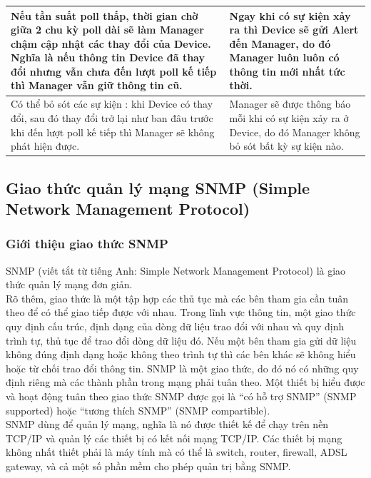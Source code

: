 \documentclass[12pt,oneside,a4paper]{article}
\begin{document}
\begin{longtable}{|p{8cm}|p{8cm}|}
Nếu tần suất poll thấp, thời gian chờ giữa 2 chu kỳ poll dài sẽ làm Manager chậm cập nhật các thay đổi của Device. Nghĩa là nếu thông tin Device đã thay đổi nhưng vẫn chưa đến lượt poll kế tiếp thì Manager vẫn giữ thông tin cũ.                            & Ngay khi có sự kiện xảy ra thì Device sẽ gửi Alert đến Manager, do đó Manager luôn luôn có thông tin mới nhất tức thời.                                                                                                                       \\ \hline
Có thể bỏ sót các sự kiện : khi Device có thay đổi, sau đó thay đổi trở lại như ban đâu trước khi đến lượt poll kế tiếp thì Manager sẽ không phát hiện được.                                                                                                   & Manager sẽ được thông báo mỗi khi có sự kiện xảy ra ở Device, do đó Manager không bỏ sót bất kỳ sự kiện nào.                                                                                                                                  \\ \hline
\end{longtable}
\subsection{Giao thức quản lý mạng SNMP (Simple Network Management Protocol)}
\subsubsection{Giới thiệu giao thức SNMP}
SNMP (viết tắt từ tiếng Anh: Simple Network Management Protocol) là giao thức quản lý mạng đơn giản.\\

Rõ thêm, giao thức là một tập hợp các thủ tục mà các bên tham gia cần tuân theo để có thể giao tiếp được với nhau. Trong lĩnh vực thông tin, một giao thức quy định cấu trúc, định dạng của dòng dữ liệu trao đổi với nhau và quy định trình tự, thủ tục để trao đổi dòng dữ liệu đó. Nếu một bên tham gia gửi dữ liệu không đúng định dạng hoặc không theo trình tự thì các bên khác sẽ không hiểu hoặc từ chối trao đổi thông tin. SNMP là một giao thức, do đó nó có những quy định riêng mà các thành phần trong mạng phải tuân theo. Một thiết bị hiểu được và hoạt động tuân theo giao thức SNMP được gọi là “có hỗ trợ SNMP” (SNMP supported) hoặc “tương thích SNMP” (SNMP compartible).\\

SNMP dùng để quản lý mạng, nghĩa là nó được thiết kế để chạy trên nền TCP/IP và quản lý các thiết bị có kết nối mạng TCP/IP. Các thiết bị mạng không nhất thiết phải là máy tính mà có thể là switch, router, firewall, ADSL gateway, và cả một số phần mềm cho phép quản trị bằng SNMP.\\
\end{document}
